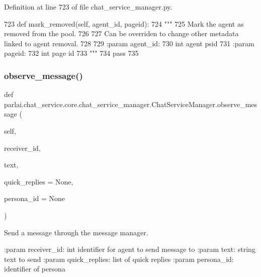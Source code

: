Definition at line 723 of file chat\+\_\+service\+\_\+manager.\+py.


\begin{DoxyCode}
723     \textcolor{keyword}{def }mark\_removed(self, agent\_id, pageid):
724         \textcolor{stringliteral}{"""}
725 \textcolor{stringliteral}{        Mark the agent as removed from the pool.}
726 \textcolor{stringliteral}{}
727 \textcolor{stringliteral}{        Can be overriden to change other metadata linked to agent removal.}
728 \textcolor{stringliteral}{}
729 \textcolor{stringliteral}{        :param agent\_id:}
730 \textcolor{stringliteral}{            int agent psid}
731 \textcolor{stringliteral}{        :param pageid:}
732 \textcolor{stringliteral}{            int page id}
733 \textcolor{stringliteral}{        """}
734         \textcolor{keywordflow}{pass}
735 
\end{DoxyCode}
\mbox{\label{classparlai_1_1chat__service_1_1core_1_1chat__service__manager_1_1ChatServiceManager_a9e1d99a460b0e21ec47e9a3ae09d73a0}} 
\subsubsection{\texorpdfstring{observe\+\_\+message()}{observe\_message()}}
{\footnotesize\ttfamily def parlai.\+chat\+\_\+service.\+core.\+chat\+\_\+service\+\_\+manager.\+Chat\+Service\+Manager.\+observe\+\_\+message (\begin{DoxyParamCaption}\item[{}]{self,  }\item[{}]{receiver\+\_\+id,  }\item[{}]{text,  }\item[{}]{quick\+\_\+replies = {\ttfamily None},  }\item[{}]{persona\+\_\+id = {\ttfamily None} }\end{DoxyParamCaption})}

\begin{DoxyVerb}Send a message through the message manager.

:param receiver_id:
    int identifier for agent to send message to
:param text:
    string text to send
:param quick_replies:
    list of quick replies
:param persona_id:
    identifier of persona
\end{DoxyVerb}
 

